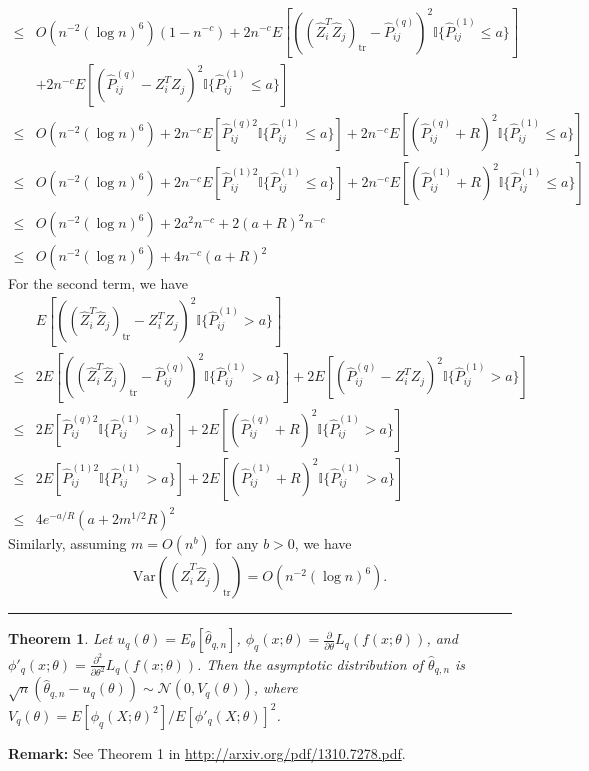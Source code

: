 \documentclass[a4paper]{article}
\newenvironment{proof}{{\bf Proof:  }}{\hfill\rule{2mm}{2mm}}
\newtheorem{theorem}[fact]{Theorem}
\begin{document}
\begin{proof}
\begin{align*}
	\le & O(n^{-2} (\log n)^6) (1 - n^{-c}) + 2 n^{-c} E[((\hat{Z}_i^T \hat{Z}_j)_{\mathrm{tr}} - \hat{P}^{(q)}_{ij})^2 \mathbb{I}\{\hat{P}^{(1)}_{ij} \le a\}] \\
	& + 2 n^{-c} E[(\hat{P}^{(q)}_{ij} - Z_i^T Z_j)^2 \mathbb{I}\{\hat{P}^{(1)}_{ij} \le a\}] \\
	\le & O(n^{-2} (\log n)^6) + 2 n^{-c} E[\hat{P}^{(q)2}_{ij} \mathbb{I}\{\hat{P}^{(1)}_{ij} \le a\}] + 2 n^{-c} E[(\hat{P}^{(q)}_{ij} + R)^2 \mathbb{I}\{\hat{P}^{(1)}_{ij} \le a\}] \\
	\le & O(n^{-2} (\log n)^6) + 2 n^{-c} E[\hat{P}^{(1)2}_{ij} \mathbb{I}\{\hat{P}^{(1)}_{ij} \le a\}] + 2 n^{-c} E[(\hat{P}^{(1)}_{ij} + R)^2 \mathbb{I}\{\hat{P}^{(1)}_{ij} \le a\}] \\
	\le & O(n^{-2} (\log n)^6) + 2 a^2 n^{-c} + 2 (a+R)^2 n^{-c} \\
	\le & O(n^{-2} (\log n)^6) + 4 n^{-c} (a + R)^2
\end{align*}
For the second term, we have
\begin{align*}
	& E[((\hat{Z}_i^T \hat{Z}_j)_{\mathrm{tr}} - Z_i^T Z_j)^2 \mathbb{I}\{\hat{P}^{(1)}_{ij} > a\}] \\
	\le & 2 E[((\hat{Z}_i^T \hat{Z}_j)_{\mathrm{tr}} - \hat{P}^{(q)}_{ij})^2 \mathbb{I}\{\hat{P}^{(1)}_{ij} > a\}] + 2 E[(\hat{P}^{(q)}_{ij} - Z_i^T Z_j)^2 \mathbb{I}\{\hat{P}^{(1)}_{ij} > a\}] \\
	\le & 2 E[\hat{P}^{(q)2}_{ij} \mathbb{I}\{\hat{P}^{(1)}_{ij} > a\}] + 2 E[(\hat{P}^{(q)}_{ij} + R)^2 \mathbb{I}\{\hat{P}^{(1)}_{ij} > a\}] \\
	\le & 2 E[\hat{P}^{(1)2}_{ij} \mathbb{I}\{\hat{P}^{(1)}_{ij} > a\}] + 2 E[(\hat{P}^{(1)}_{ij} + R)^2 \mathbb{I}\{\hat{P}^{(1)}_{ij} > a\}] \\
	\le & 4 e^{-a/R} (a + 2 m^{1/2} R)^2
\end{align*}
Similarly, assuming $m = O(n^b)$ for any $b > 0$, we have
\[
	\mathrm{Var}((\hat{Z}_i^T \hat{Z}_j)_{\mathrm{tr}})
	= O(n^{-2} (\log n)^6).
\]
\end{proof}



\begin{theorem}
\label{thm:VarLq}
Let $u_q(\theta) = E_{\theta}[\hat{\theta}_{q,n}]$, $\phi_q(x;\theta) = \frac{\partial}{\partial \theta}L_q(f(x;\theta))$, and $\phi'_q(x;\theta) = \frac{\partial^2}{\partial \theta^2}L_q(f(x;\theta))$. Then the asymptotic distribution of $\hat{\theta}_{q,n}$ is $\sqrt{n}(\hat{\theta}_{q,n} - u_q(\theta)) \sim \mathcal{N}(0, V_q(\theta))$, where $V_q(\theta) = E[\phi_q(X;\theta)^2]/E[\phi'_q(X;\theta)]^2$.
\end{theorem}
\textbf{Remark:} See Theorem 1 in \href{url}{http://arxiv.org/pdf/1310.7278.pdf}.
\end{document}
